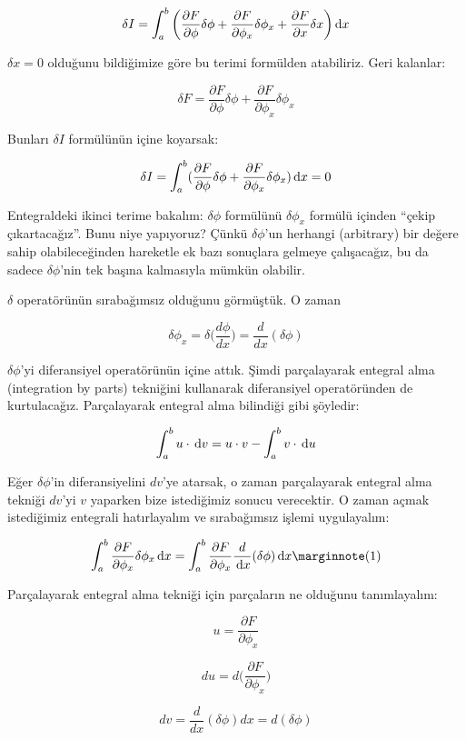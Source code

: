 \documentclass[12pt,fleqn]{article}\usepackage{../../common}
\begin{document}
$$ \delta I = \int_{a}^{b} \bigg(
\frac{\partial F}{\partial \phi}\delta\phi +
\frac{\partial F}{\partial \phi_x}\delta\phi_x +
\frac{\partial F}{\partial x}\delta x 
\bigg) \,\mathrm{d} x
 $$

$\delta x = 0$ olduğunu bildiğimize göre bu terimi formülden
atabiliriz. Geri kalanlar:

$$ 
\delta F = 
\frac{\partial F}{\partial \phi}\delta\phi +
\frac{\partial F}{\partial \phi_x}\delta\phi_x  
$$

Bunları $\delta I$ formülünün içine koyarsak:

$$ 
\delta I  = \int_{a}^{b} (
\frac{\partial F}{\partial \phi}\delta\phi +
\frac{\partial F}{\partial \phi_x}\delta\phi_x 
) \,\mathrm{d} x = 0
 $$

Entegraldeki ikinci terime bakalım: $\delta \phi$ formülünü $\delta
\phi_x$ formülü içinden ``çekip çıkartacağız''. Bunu niye yapıyoruz?
Çünkü $\delta \phi$'un herhangi (arbitrary) bir değere sahip
olabileceğinden hareketle ek bazı sonuçlara gelmeye çalışacağız, bu
da sadece $\delta \phi$'nin tek başına kalmasıyla mümkün olabilir.

$\delta$ operatörünün sırabağımsız olduğunu görmüştük. O zaman 

$$ 
\delta \phi_x = \delta \bigg( \frac{d\phi}{dx} \bigg) =
\frac{d}{dx}(\delta \phi)
 $$

$\delta \phi$'yi diferansiyel operatörünün içine attık. Şimdi parçalayarak
entegral alma (integration by parts) tekniğini kullanarak diferansiyel
operatöründen de kurtulacağız. Parçalayarak entegral alma bilindiği gibi 
şöyledir:

$$ \int_a^b u \cdot \,\mathrm{d} v = u \cdot v - \int_a^b v \cdot \,\mathrm{d} u $$

Eğer $\delta \phi$'in diferansiyelini $dv$'ye atarsak, o zaman parçalayarak
entegral alma tekniği $dv$'yi $v$ yaparken bize istediğimiz sonucu verecektir. O
zaman açmak istediğimiz entegrali hatırlayalım ve sırabağımsız işlemi uygulayalım:

$$
\int_{a}^{b} \frac{\partial F}{\partial \phi_x}\delta\phi_x \ud x =
\int_{a}^{b} \frac{\partial F}{\partial \phi_x} \frac{d}{\ud x}(\delta \phi) \ud x 
\mlabel{1}
$$

Parçalayarak entegral alma tekniği için parçaların ne olduğunu tanımlayalım:

$$ u = \frac{\partial F}{\partial \phi_x}  $$

$$ du  = d \bigg( \frac{\partial F}{\partial \phi_x} \bigg) $$

$$ dv  = \frac{d}{dx}(\delta \phi)dx = d(\delta \phi) $$
\end{document}
